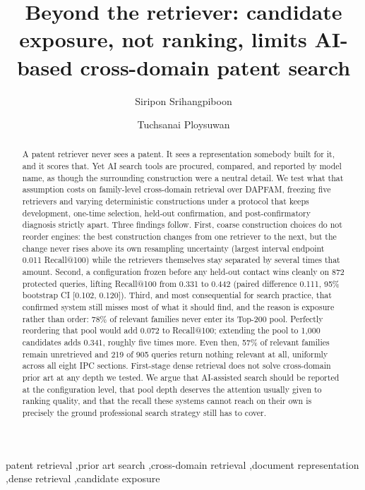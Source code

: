 \documentclass[preprint,11pt,authoryear]{elsarticle}
\begin{document}
\begin{frontmatter}

\title{Beyond the retriever: candidate exposure, not ranking, limits AI-based cross-domain patent search}

\author[a]{Siripon Srihangpiboon}
\author[a]{Tuchsanai Ploysuwan}
\address[a]{School of Information Technology, King Mongkut's Institute of Technology Ladkrabang, Bangkok, Thailand}

\begin{abstract}
A patent retriever never sees a patent. It sees a representation somebody built for it, and it scores that. Yet AI search tools are procured, compared, and reported by model name, as though the surrounding construction were a neutral detail. We test what that assumption costs on family-level cross-domain retrieval over DAPFAM, freezing five retrievers and varying deterministic constructions under a protocol that keeps development, one-time selection, held-out confirmation, and post-confirmatory diagnosis strictly apart. Three findings follow. First, coarse construction choices do not reorder engines: the best construction changes from one retriever to the next, but the change never rises above its own resampling uncertainty (largest interval endpoint 0.011 Recall@100) while the retrievers themselves stay separated by several times that amount. Second, a configuration frozen before any held-out contact wins cleanly on 872 protected queries, lifting Recall@100 from 0.331 to 0.442 (paired difference 0.111, 95\% bootstrap CI [0.102, 0.120]). Third, and most consequential for search practice, that confirmed system still misses most of what it should find, and the reason is exposure rather than order: 78\% of relevant families never enter its Top-200 pool. Perfectly reordering that pool would add 0.072 to Recall@100; extending the pool to 1{,}000 candidates adds 0.341, roughly five times more. Even then, 57\% of relevant families remain unretrieved and 219 of 905 queries return nothing relevant at all, uniformly across all eight IPC sections. First-stage dense retrieval does not solve cross-domain prior art at any depth we tested. We argue that AI-assisted search should be reported at the configuration level, that pool depth deserves the attention usually given to ranking quality, and that the recall these systems cannot reach on their own is precisely the ground professional search strategy still has to cover.
\end{abstract}

\begin{keyword}
patent retrieval \sep prior art search \sep cross-domain retrieval \sep document representation \sep dense retrieval \sep candidate exposure
\end{keyword}

\end{frontmatter}
\end{document}
